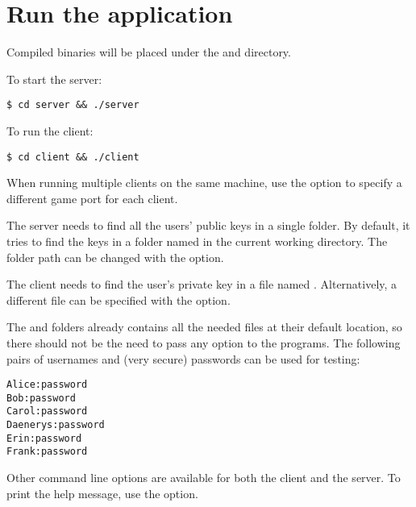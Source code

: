 \section{Run the application}\label{appendix:howtorun}

Compiled binaries will be placed under the  and 
directory.

To start the server:
\begin{verbatim}
$ cd server && ./server
\end{verbatim}

To run the client:
\begin{verbatim}
$ cd client && ./client
\end{verbatim}

When running multiple clients on the same machine, use the  option to
specify a different game port for each client.

The server needs to find all the users' public keys in a single folder. By
default, it tries to find the keys in a folder named  in the current
working directory. The folder path can be changed with the  option.

The client needs to find the user's private key in a file named
. Alternatively, a different file can be specified with the
 option.

The  and  folders already contains all the needed
files at their default location, so there should not be the need to pass any
option to the programs. The following pairs of usernames and (very secure)
passwords can be used for testing:
\begin{verbatim}
Alice:password
Bob:password
Carol:password
Daenerys:password
Erin:password
Frank:password
\end{verbatim}

Other command line options are available for both the client and the server. To
print the help message, use the  option.

